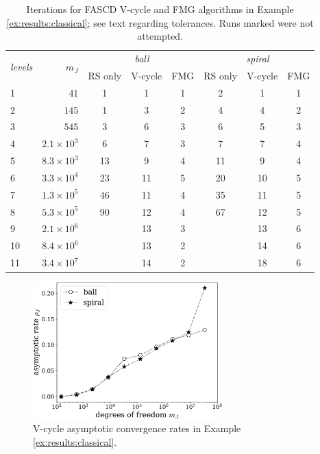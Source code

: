 \documentclass[review,hidelinks,onefignum,onetabnum,final]{siamart220329}  %
\newcommand{\XX}{\ding{55}}
\begin{document}
\begin{table}[ht]
\centering
\begin{tabular}{lr@{\hskip 7mm}cccccc}
\toprule
\multirow{2}{*}{\emph{levels}} & \multirow{2}{*}{$m_J$} & \multicolumn{3}{c}{\,\emph{ball}} & \multicolumn{3}{c}{\,\emph{spiral}} \\ \cmidrule(lr){3-5} \cmidrule(lr){6-8}
   &                  & RS only & V-cycle & FMG & RS only & V-cycle & FMG \\
\midrule
 1 &             $41$ &   1 &  1 &  1 &   2 &  1 &  1 \\
 2 &            $145$ &   1 &  3 &  2 &   4 &  4 &  2 \\
 3 &            $545$ &   3 &  6 &  3 &   6 &  5 &  3 \\
 4 & $2.1\times 10^3$ &   6 &  7 &  3 &   7 &  7 &  4 \\
 5 & $8.3\times 10^3$ &  13 &  9 &  4 &  11 &  9 &  4 \\
 6 & $3.3\times 10^4$ &  23 & 11 &  5 &  20 & 10 &  5 \\
 7 & $1.3\times 10^5$ &  46 & 11 &  4 &  35 & 11 &  5 \\
 8 & $5.3\times 10^5$ &  90 & 12 &  4 &  67 & 12 &  5 \\
 9 & $2.1\times 10^6$ & \XX & 13 &  3 & \XX & 13 &  6 \\
10 & $8.4\times 10^6$ & \XX & 13 &  2 & \XX & 14 &  6 \\
11 & $3.4\times 10^7$ & \XX & 14 &  2 & \XX & 18 &  6 \\
\bottomrule
\end{tabular}
\bigskip
\caption{Iterations for FASCD V-cycle and FMG algorithms in Example \ref{ex:results:classical}; see text regarding tolerances.  Runs marked \XX\xspace were not attempted.}
\label{tab:results:classical}
\end{table}

\begin{figure}[ht]
\centering
\includegraphics[width=0.65\textwidth]{asymprates.pdf}
\caption{V-cycle asymptotic convergence rates in Example \ref{ex:results:classical}.}
\label{fig:results:asymp}
\end{figure}
\end{document}
